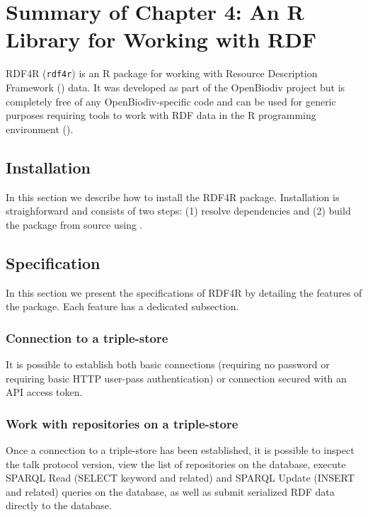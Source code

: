 \chapter{Summary of Chapter 4: An R Library for Working with RDF}
\label{chapter-rdf4r}

RDF4R ({\tt rdf4r}) is an R package for working with Resource Description Framework (\cite{rdf_working_group_resource_2014}) data. It was developed as part of the OpenBiodiv project but is completely free of any OpenBiodiv-specific code and can be used for generic purposes requiring tools to work with RDF data in the R programming environment (\cite{r_core_team_r:_2016}).

\section{Installation}

In this section we describe how to install the RDF4R package. Installation is straighforward and consists of two steps: (1) resolve dependencies and (2) build the package from source using .

\section{Specification}

In this section we present the specifications of RDF4R by detailing the features of the package. Each feature has a dedicated subsection.

\subsection{Connection to a triple-store}

It is possible to establish both basic connections (requiring no password or requiring basic HTTP user-pass authentication) or connection secured with an API access token.

\subsection{Work with repositories on a triple-store}

Once a connection to a triple-store has been established, it is possible to inspect the talk protocol version, view the list of repositories on the database, execute SPARQL Read (SELECT keyword and related) and SPARQL Update (INSERT and related) queries on the database, as well as submit serialized RDF data directly to the database.

